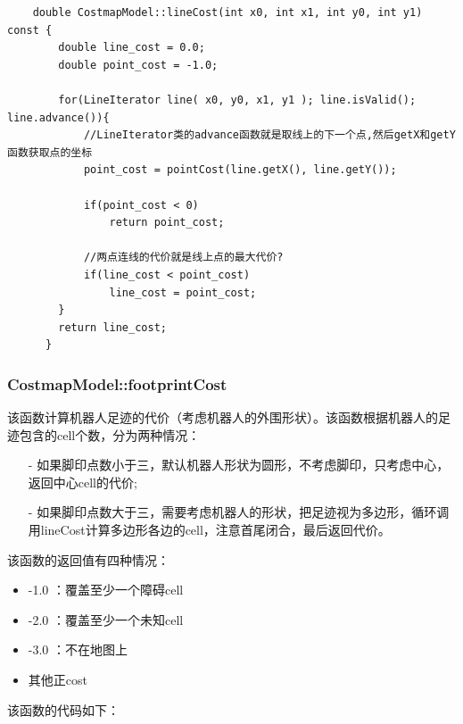 \documentclass[9pt, oneside]{book}
\begin{document}
\footnotesize
\begin{verbatim}
    double CostmapModel::lineCost(int x0, int x1, int y0, int y1) const {
        double line_cost = 0.0;
        double point_cost = -1.0;
    
        for(LineIterator line( x0, y0, x1, y1 ); line.isValid(); line.advance()){
            //LineIterator类的advance函数就是取线上的下一个点,然后getX和getY函数获取点的坐标
            point_cost = pointCost(line.getX(), line.getY());
        
            if(point_cost < 0)
                return point_cost;
        
            //两点连线的代价就是线上点的最大代价?
            if(line_cost < point_cost)
                line_cost = point_cost;
        }
        return line_cost;
      }
\end{verbatim}
\normalsize

\subsubsection{CostmapModel::footprintCost}

该函数计算机器人足迹的代价（考虑机器人的外围形状）。该函数根据机器人的足迹包含的cell个数，分为两种情况：

\begin{itemize}
    \item [-] 如果脚印点数小于三，默认机器人形状为圆形，不考虑脚印，只考虑中心，返回中心cell的代价;
    \item [-] 如果脚印点数大于三，需要考虑机器人的形状，把足迹视为多边形，循环调用lineCost计算多边形各边的cell，注意首尾闭合，最后返回代价。
\end{itemize}

该函数的返回值有四种情况：

\begin{itemize}
    \item -1.0 ：覆盖至少一个障碍cell
    \item -2.0 ：覆盖至少一个未知cell
    \item -3.0 ：不在地图上
    \item 其他正cost
\end{itemize}

该函数的代码如下：
\end{document}
